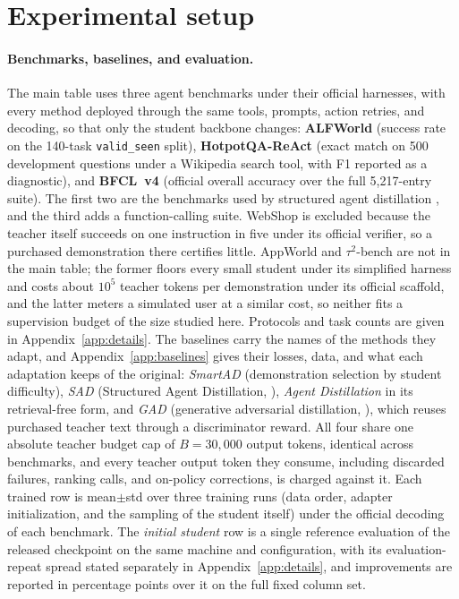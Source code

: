 \section{Experimental setup}\label{sec:expsetting}

\paragraph{Benchmarks, baselines, and evaluation.}
The main table uses three agent benchmarks under their official
harnesses, with every method deployed through the same tools, prompts,
action retries, and decoding, so that only the student backbone
changes: \textbf{ALFWorld} \citep{shridhar2021alfworld} (success rate
on the 140-task \texttt{valid\_seen} split),
\textbf{HotpotQA-ReAct} \citep{yang2018hotpotqa, yao2023react}
(exact match on 500 development questions under a Wikipedia search
tool, with F1 reported as a diagnostic), and \textbf{BFCL~v4}
(official overall accuracy over the full 5{,}217-entry suite). The
first two are the benchmarks used by structured agent distillation
\citep{liu2025structured}, and the third adds a function-calling
suite. WebShop \citep{yao2022webshop} is excluded because the teacher
itself succeeds on one instruction in five under its official
verifier, so a purchased demonstration there certifies little. AppWorld
\citep{trivedi2024appworld} and $\tau^2$-bench \citep{yao2024taubench}
are not in the main table; the former floors every small student under
its simplified harness and costs about $10^5$ teacher tokens per
demonstration under its official scaffold, and the latter meters a
simulated user at a similar cost, so neither fits a supervision budget
of the size studied here. Protocols and task counts are given in
Appendix~\ref{app:details}. The baselines carry the names of the
methods they adapt, and Appendix~\ref{app:baselines} gives their
losses, data, and what each adaptation keeps of the original:
\emph{SmartAD} (demonstration selection by student difficulty),
\emph{SAD} (Structured Agent Distillation, \citealp{liu2025structured}),
\emph{Agent Distillation} \citep{kang2025distilling} in its
retrieval-free form, and \emph{GAD} (generative adversarial
distillation, \citealp{ye2025bbopd}), which reuses purchased teacher
text through a discriminator reward. All four share one absolute
teacher budget cap of $B=30{,}000$ output tokens, identical across
benchmarks, and every teacher output token they consume, including
discarded failures, ranking calls, and on-policy corrections, is
charged against it. Each trained row is
mean$\pm$std over three training runs (data order, adapter
initialization, and the sampling of the student itself) under the
official decoding of each benchmark. The \emph{initial student} row is
a single reference evaluation of the released checkpoint on the same
machine and configuration, with its evaluation-repeat spread stated
separately in Appendix~\ref{app:details}, and improvements are
reported in percentage points over it on the full fixed column set.

